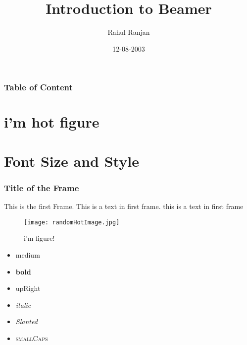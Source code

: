 \documentclass{beamer}
\title{Introduction to Beamer}
\author{Rahul Ranjan}
\date{12-08-2003}
\begin{document}
\maketitle
\newpage

\begin{frame}
    \frametitle{Table of Content}
       
            \tableofcontents{}
            \section{i'm hot figure}
            \section{Font Size and Style}  
\end{frame}
\begin{frame}
        \frametitle{Title of the Frame}
        This is the first Frame. This is a text in first frame. this is a text in first frame
        \newpage
        \begin{figure}[H]
        \texttt{[image: randomHotImage.jpg]}
        \caption{i'm figure!}
        \end{figure}
    
\end{frame}
\begin{frame}
    \begin{itemize}
      \frametitle{Font Size and Style}
    \item  \textmd{medium}\newline
    \item  \textbf{bold}\newline
    \item  \textup{upRight}\newline
    \item  \textit{italic}\newline
    \item   \textsl{Slanted}\newline
    \item   \textsc{smallCaps}\newline

    \end{itemize}
\end{frame}
\end{document}
